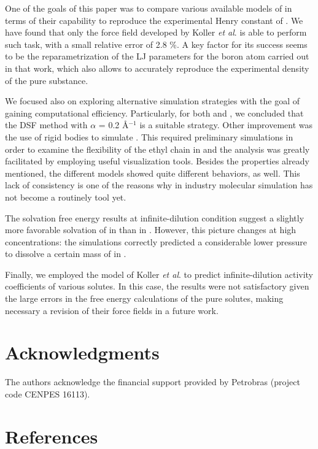 \documentclass[3p,twocolumn]{elsarticle}
\begin{document}
One of the goals of this paper was to compare various available models of \ce{[emim][B(CN)_4]} in terms of their capability to reproduce the experimental Henry constant of .
We have found that only the force field developed by Koller \textit{et al}. \cite{Koller_2012} is able to perform such task, with a small relative error of 2.8 \%.
A key factor for its success seems to be the reparametrization of the LJ parameters for the boron atom carried out in that work, which also allows to accurately reproduce the experimental density of the pure substance.

We focused also on exploring alternative simulation strategies with the goal of gaining computational efficiency.
Particularly, for both \ce{[emim][B(CN)_4]} and \ce{[emim][NTf_2]}, we concluded that the DSF method with $\alpha$ = 0.2 {\AA}$^{-1}$ is a suitable strategy.
Other improvement was the use of rigid bodies to simulate \ce{[emim][B(CN)_4]}.
This required preliminary simulations in order to examine the flexibility of the ethyl chain in \ce{[emim]^+} and the analysis was greatly facilitated by employing useful visualization tools.
Besides the properties already mentioned, the different models showed quite different behaviors, as well.
This lack of consistency is one of the reasons why in industry molecular simulation has not become a routinely tool yet.

The solvation free energy results at infinite-dilution condition suggest a slightly more favorable solvation of  in \ce{[emim][B(CN)_4]} than in  \ce{[emim][NTf_2]}.
However, this picture changes at high concentrations: the simulations correctly predicted a considerable lower pressure to dissolve a certain mass of  in \ce{[emim][B(CN)_4]}.

Finally, we employed the model of Koller \textit{et al}. \cite{Koller_2012} to predict infinite-dilution activity coefficients of various solutes.
In this case, the results were not satisfactory given the large errors in the free energy calculations of the pure solutes, making necessary a revision of their force fields in a future work.

\section*{Acknowledgments}
The authors acknowledge the financial support provided by Petrobras (project code CENPES 16113). 

\section*{References}


\end{document}
